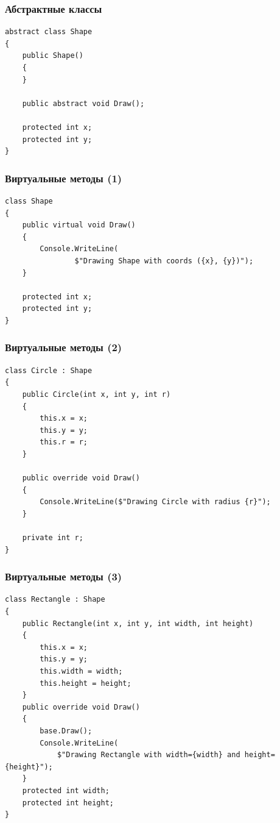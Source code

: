 \documentclass{../../slides-style}
\begin{document}
    \begin{frame}[fragile]
        \frametitle{Абстрактные классы}
        \begin{verbatim}
abstract class Shape
{
    public Shape() 
    {
    }

    public abstract void Draw();

    protected int x;
    protected int y;
}
        \end{verbatim}
    \end{frame}

    \begin{frame}[fragile]
        \frametitle{Виртуальные методы (1)}
        \begin{verbatim}
class Shape
{
    public virtual void Draw()
    {
        Console.WriteLine(
                $"Drawing Shape with coords ({x}, {y})");
    }

    protected int x;
    protected int y;
}
        \end{verbatim}
    \end{frame}

    \begin{frame}[fragile]
        \frametitle{Виртуальные методы (2)}
        \begin{verbatim}
class Circle : Shape
{
    public Circle(int x, int y, int r)
    {
        this.x = x;
        this.y = y;
        this.r = r;
    }

    public override void Draw()
    {
        Console.WriteLine($"Drawing Circle with radius {r}");
    }

    private int r;
}
        \end{verbatim}
    \end{frame}

    \begin{frame}[fragile]
        \frametitle{Виртуальные методы (3)}
        \begin{footnotesize}
            \begin{verbatim}
class Rectangle : Shape
{
    public Rectangle(int x, int y, int width, int height)
    {
        this.x = x;
        this.y = y;
        this.width = width;
        this.height = height;
    }
    public override void Draw()
    {
        base.Draw();
        Console.WriteLine(
            $"Drawing Rectangle with width={width} and height={height}");
    }
    protected int width;
    protected int height;
}
            \end{verbatim}
        \end{footnotesize}
    \end{frame}
\end{document}
